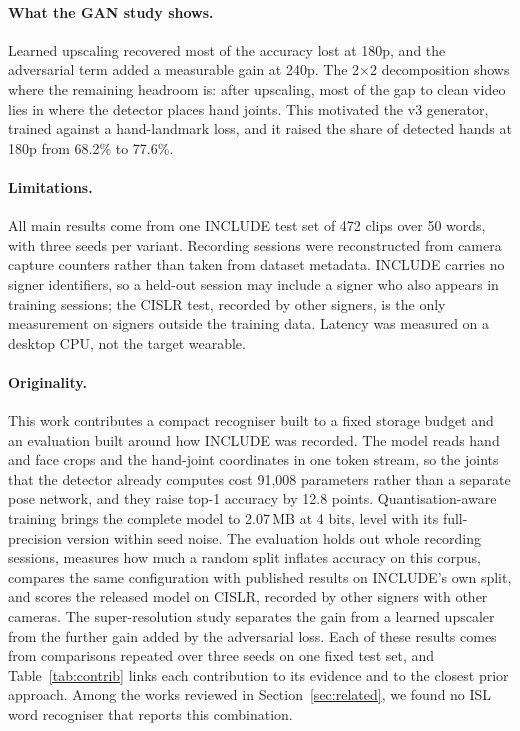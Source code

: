 \documentclass[pdflatex,sn-mathphys-num,twocolumn]{sn-jnl}
\theoremstyle{thmstyleone}%
\begin{document}
\paragraph{What the GAN study shows.} Learned upscaling recovered most of the accuracy lost at 180p, and the adversarial term added a measurable gain at 240p. The 2$\times$2 decomposition shows where the remaining headroom is: after upscaling, most of the gap to clean video lies in where the detector places hand joints. This motivated the v3 generator, trained against a hand-landmark loss, and it raised the share of detected hands at 180p from 68.2\% to 77.6\%.

\paragraph{Limitations.} All main results come from one INCLUDE test set of 472 clips over 50 words, with three seeds per variant. Recording sessions were reconstructed from camera capture counters rather than taken from dataset metadata. INCLUDE carries no signer identifiers, so a held-out session may include a signer who also appears in training sessions; the CISLR test, recorded by other signers, is the only measurement on signers outside the training data. Latency was measured on a desktop CPU, not the target wearable.

\paragraph{Originality.} This work contributes a compact recogniser built to a fixed storage budget and an evaluation built around how INCLUDE was recorded. The model reads hand and face crops and the hand-joint coordinates in one token stream, so the joints that the detector already computes cost 91,008 parameters rather than a separate pose network, and they raise top-1 accuracy by 12.8 points. Quantisation-aware training brings the complete model to 2.07\,MB at 4 bits, level with its full-precision version within seed noise. The evaluation holds out whole recording sessions, measures how much a random split inflates accuracy on this corpus, compares the same configuration with published results on INCLUDE's own split, and scores the released model on CISLR, recorded by other signers with other cameras. The super-resolution study separates the gain from a learned upscaler from the further gain added by the adversarial loss. Each of these results comes from comparisons repeated over three seeds on one fixed test set, and Table~\ref{tab:contrib} links each contribution to its evidence and to the closest prior approach. Among the works reviewed in Section~\ref{sec:related}, we found no ISL word recogniser that reports this combination.
\end{document}
